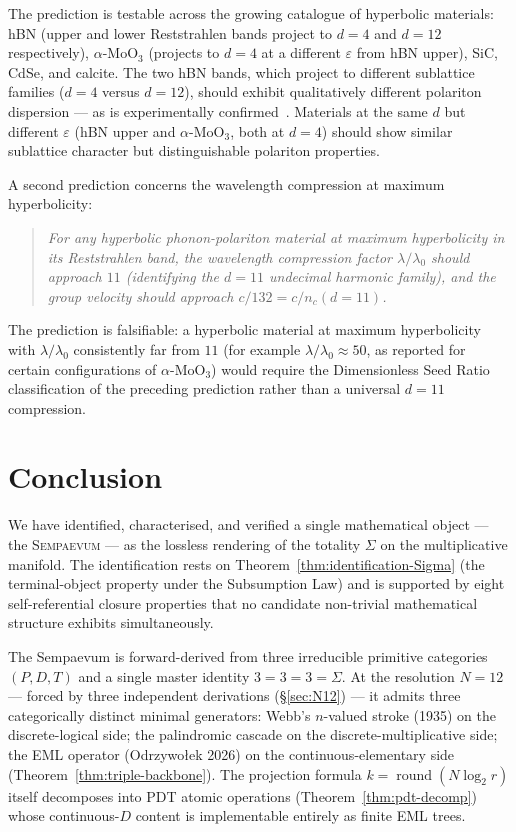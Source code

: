 \documentclass[11pt,a4paper]{article}
\theoremstyle{definition}
\theoremstyle{remark}
\DeclareMathOperator{\round}{round}
\newcommand{\Sempaevum}{\textsc{Sempaevum}}
\begin{document}
The prediction is testable across the growing catalogue of hyperbolic materials: hBN (upper and lower Reststrahlen bands project to $d=4$ and $d=12$ respectively), $\alpha$-MoO$_{3}$ (projects to $d=4$ at a different $\varepsilon$ from hBN upper), SiC, CdSe, and calcite. The two hBN bands, which project to different sublattice families ($d=4$ versus $d=12$), should exhibit qualitatively different polariton dispersion --- as is experimentally confirmed~\cite{Bucher2025}. Materials at the same $d$ but different $\varepsilon$ (hBN upper and $\alpha$-MoO$_{3}$, both at $d=4$) should show similar sublattice character but distinguishable polariton properties.

A second prediction concerns the wavelength compression at maximum hyperbolicity:

\begin{quote}\itshape
For any hyperbolic phonon-polariton material at maximum hyperbolicity in its Reststrahlen band, the wavelength compression factor $\lambda/\lambda_{0}$ should approach $11$ (identifying the $d=11$ undecimal harmonic family), and the group velocity should approach $c/132 = c/n_{c}(d{=}11)$.
\end{quote}

The prediction is falsifiable: a hyperbolic material at maximum hyperbolicity with $\lambda/\lambda_{0}$ consistently far from $11$ (for example $\lambda/\lambda_{0} \approx 50$, as reported for certain configurations of $\alpha$-MoO$_{3}$) would require the Dimensionless Seed Ratio classification of the preceding prediction rather than a universal $d=11$ compression.

\section{Conclusion}\label{sec:conclusion}

We have identified, characterised, and verified a single mathematical object --- the \Sempaevum{} --- as the lossless rendering of the totality $\Sigma$ on the multiplicative manifold. The identification rests on Theorem~\ref{thm:identification-Sigma} (the terminal-object property under the Subsumption Law) and is supported by eight self-referential closure properties that no candidate non-trivial mathematical structure exhibits simultaneously.

The Sempaevum is forward-derived from three irreducible primitive categories $(P,D,T)$ and a single master identity $3=3=3=\Sigma$. At the resolution $N=12$ --- forced by three independent derivations (\S\ref{sec:N12}) --- it admits three categorically distinct minimal generators: Webb's $n$-valued stroke (1935) on the discrete-logical side; the palindromic cascade on the discrete-multiplicative side; the EML operator (Odrzywo{\l}ek 2026) on the continuous-elementary side (Theorem~\ref{thm:triple-backbone}). The projection formula $k=\round(N\log_{2}r)$ itself decomposes into PDT atomic operations (Theorem~\ref{thm:pdt-decomp}) whose continuous-$D$ content is implementable entirely as finite EML trees.
\end{document}

